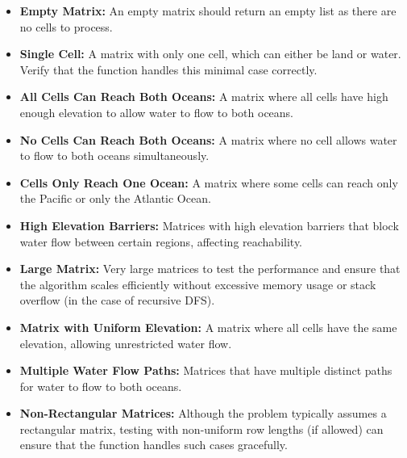 \begin{itemize}
    \item \textbf{Empty Matrix:} An empty matrix should return an empty list as there are no cells to process.
    
    \item \textbf{Single Cell:} A matrix with only one cell, which can either be land or water. Verify that the function handles this minimal case correctly.
    
    \item \textbf{All Cells Can Reach Both Oceans:} A matrix where all cells have high enough elevation to allow water to flow to both oceans.
    
    \item \textbf{No Cells Can Reach Both Oceans:} A matrix where no cell allows water to flow to both oceans simultaneously.
    
    \item \textbf{Cells Only Reach One Ocean:} A matrix where some cells can reach only the Pacific or only the Atlantic Ocean.
    
    \item \textbf{High Elevation Barriers:} Matrices with high elevation barriers that block water flow between certain regions, affecting reachability.
    
    \item \textbf{Large Matrix:} Very large matrices to test the performance and ensure that the algorithm scales efficiently without excessive memory usage or stack overflow (in the case of recursive DFS).
    
    \item \textbf{Matrix with Uniform Elevation:} A matrix where all cells have the same elevation, allowing unrestricted water flow.
    
    \item \textbf{Multiple Water Flow Paths:} Matrices that have multiple distinct paths for water to flow to both oceans.
    
    \item \textbf{Non-Rectangular Matrices:} Although the problem typically assumes a rectangular matrix, testing with non-uniform row lengths (if allowed) can ensure that the function handles such cases gracefully.
\end{itemize}

